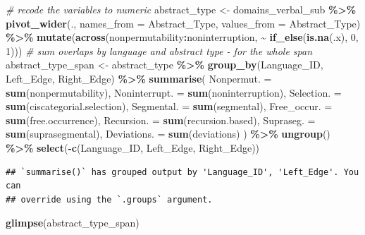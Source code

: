 \documentclass[
]{article}
\newenvironment{Shaded}{\begin{snugshade}}{\end{snugshade}}
\newcommand{\AttributeTok}[1]{\textcolor[rgb]{0.13,0.29,0.53}{#1}}
\newcommand{\CommentTok}[1]{\textcolor[rgb]{0.56,0.35,0.01}{\textit{#1}}}
\newcommand{\DecValTok}[1]{\textcolor[rgb]{0.00,0.00,0.81}{#1}}
\newcommand{\FunctionTok}[1]{\textcolor[rgb]{0.13,0.29,0.53}{\textbf{#1}}}
\newcommand{\NormalTok}[1]{#1}
\newcommand{\OtherTok}[1]{\textcolor[rgb]{0.56,0.35,0.01}{#1}}
\newcommand{\SpecialCharTok}[1]{\textcolor[rgb]{0.81,0.36,0.00}{\textbf{#1}}}
\begin{document}
\begin{Shaded}
\begin{Highlighting}[]
\CommentTok{\# recode the variables to numeric}
\NormalTok{abstract\_type }\OtherTok{\textless{}{-}}\NormalTok{ domains\_verbal\_sub }\SpecialCharTok{\%\textgreater{}\%}
  \FunctionTok{pivot\_wider}\NormalTok{(., }\AttributeTok{names\_from =}\NormalTok{ Abstract\_Type, }\AttributeTok{values\_from =}\NormalTok{ Abstract\_Type) }\SpecialCharTok{\%\textgreater{}\%}
  \FunctionTok{mutate}\NormalTok{(}\FunctionTok{across}\NormalTok{(nonpermutability}\SpecialCharTok{:}\NormalTok{noninterruption, }\SpecialCharTok{\textasciitilde{}} \FunctionTok{if\_else}\NormalTok{(}\FunctionTok{is.na}\NormalTok{(.x), }\DecValTok{0}\NormalTok{, }\DecValTok{1}\NormalTok{)))}
\CommentTok{\# sum overlaps by language and abstract type {-} for the whole span}
\NormalTok{abstract\_type\_span }\OtherTok{\textless{}{-}}\NormalTok{ abstract\_type }\SpecialCharTok{\%\textgreater{}\%}
  \FunctionTok{group\_by}\NormalTok{(Language\_ID, Left\_Edge, Right\_Edge) }\SpecialCharTok{\%\textgreater{}\%}
  \FunctionTok{summarise}\NormalTok{(}
    \AttributeTok{Nonpermut. =} \FunctionTok{sum}\NormalTok{(nonpermutability),}
    \AttributeTok{Noninterrupt. =} \FunctionTok{sum}\NormalTok{(noninterruption),}
    \AttributeTok{Selection. =} \FunctionTok{sum}\NormalTok{(ciscategorial.selection),}
    \AttributeTok{Segmental. =} \FunctionTok{sum}\NormalTok{(segmental),}
    \AttributeTok{Free\_occur. =} \FunctionTok{sum}\NormalTok{(free.occurrence),}
    \AttributeTok{Recursion. =} \FunctionTok{sum}\NormalTok{(recursion.based),}
    \AttributeTok{Supraseg. =} \FunctionTok{sum}\NormalTok{(suprasegmental),}
    \AttributeTok{Deviations. =} \FunctionTok{sum}\NormalTok{(deviations)}
\NormalTok{  ) }\SpecialCharTok{\%\textgreater{}\%}
  \FunctionTok{ungroup}\NormalTok{() }\SpecialCharTok{\%\textgreater{}\%}
  \FunctionTok{select}\NormalTok{(}\SpecialCharTok{{-}}\FunctionTok{c}\NormalTok{(Language\_ID, Left\_Edge, Right\_Edge))}
\end{Highlighting}
\end{Shaded}

\begin{verbatim}
## `summarise()` has grouped output by 'Language_ID', 'Left_Edge'. You can
## override using the `.groups` argument.
\end{verbatim}

\begin{Shaded}
\begin{Highlighting}[]
\FunctionTok{glimpse}\NormalTok{(abstract\_type\_span)}
\end{Highlighting}
\end{Shaded}
\end{document}
